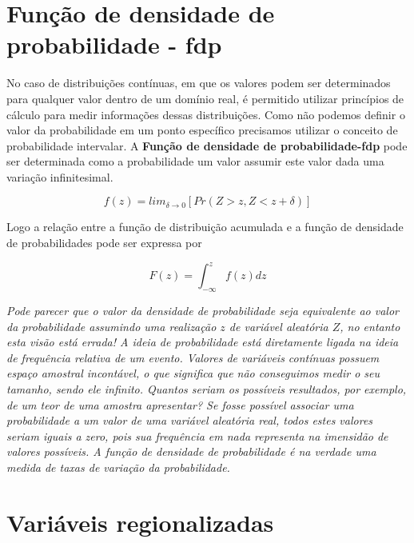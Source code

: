 \section{Função de densidade de probabilidade - fdp}  

No caso de distribuições contínuas, em que os valores podem ser determinados para qualquer valor dentro de um domínio real, é permitido utilizar princípios de cálculo para medir informações dessas distribuições. Como não podemos definir o valor da probabilidade em um ponto específico precisamos utilizar o conceito de probabilidade intervalar. A \textbf{Função de densidade de probabilidade-fdp} pode ser determinada como a probabilidade um valor assumir este valor dada uma variação infinitesimal.

\begin{equation}
f(z) = lim_{\delta \rightarrow 0}\left [ Pr(Z > z, Z < z + \delta ) \right ]
\end{equation}

Logo a relação entre a função de distribuição acumulada e a função de densidade de probabilidades pode ser expressa por 

\begin{equation}
F(z) = \int_{-\infty }^{z} f(z) dz
\end{equation}

\begin{proposition}
	\textit{Pode parecer que o valor da densidade de probabilidade seja equivalente ao valor da probabilidade assumindo uma realização $z$ de variável aleatória $Z$, no entanto esta visão está errada! A ideia de probabilidade está diretamente ligada na ideia de frequência relativa de um evento. Valores de variáveis contínuas possuem espaço amostral incontável, o que significa que não conseguimos medir o seu tamanho, sendo ele infinito. Quantos seriam os possíveis resultados, por exemplo, de um teor de uma amostra apresentar? Se fosse possível associar uma probabilidade a um valor de uma variável aleatória real, todos estes valores seriam iguais a zero, pois sua frequência em nada representa na imensidão de valores possíveis. A função de densidade de probabilidade é na verdade uma medida de taxas de variação da probabilidade.}
\end{proposition}

\section{Variáveis regionalizadas} 


